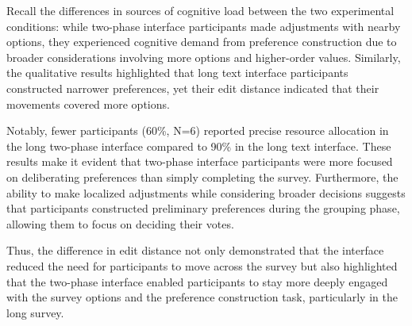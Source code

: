 Recall the differences in sources of cognitive load between the two experimental conditions: while two-phase interface participants made adjustments with nearby options, they experienced cognitive demand from preference construction due to broader considerations involving more options and higher-order values. Similarly, the qualitative results highlighted that long text interface participants constructed narrower preferences, yet their edit distance indicated that their movements covered more options. 

Notably, fewer participants (60\%, N=6) reported precise resource allocation in the long two-phase interface compared to 90\% in the long text interface. These results make it evident that two-phase interface participants were more focused on deliberating preferences than simply completing the survey. Furthermore, the ability to make localized adjustments while considering broader decisions suggests that participants constructed preliminary preferences during the grouping phase, allowing them to focus on deciding their votes. 

Thus, the difference in edit distance not only demonstrated that the interface reduced the need for participants to move across the survey but also highlighted that the two-phase interface enabled participants to stay more deeply engaged with the survey options and the preference construction task, particularly in the long survey.



